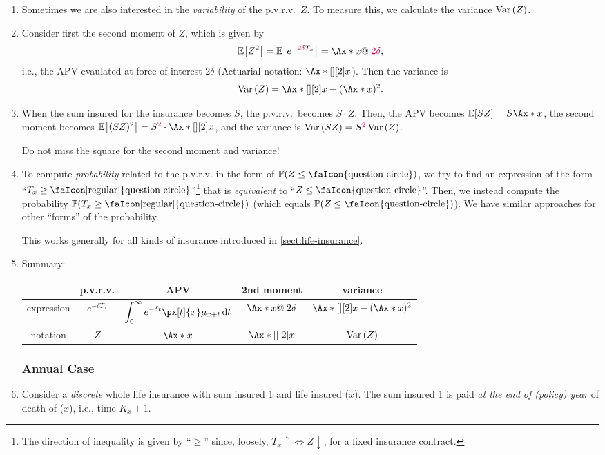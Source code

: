 \begin{enumerate}
\item Sometimes we are also interested in the \emph{variability} of the
p.v.r.v.\ \(Z\). To measure this, we calculate the variance \(\operatorname{Var}\qty(Z)\).
\item Consider first the second moment of \(Z\), which is given by
\[
\expv{Z^2}=\expv{e^{-{\color{purple} 2\delta} T_x}}=\Ax*{x}@\;{\color{purple} 2\delta},
\]
i.e., the APV evaulated at force of interest \(2\delta\) (Actuarial notation:
\(\Ax*[][2]{x}\)). Then the variance is
\[
\vari{Z}=\Ax*[][2]{x}-(\Ax*{x})^2.
\]
\item When the sum insured for the insurance becomes \( S\), the p.v.r.v.\
becomes \(S\cdot Z\). Then, the APV becomes \(\expv{SZ}=S\Ax*{x}\), the second
moment becomes \(\expv{(SZ)^2}=S^{\color{purple}2}\cdot\Ax*[][2]{x}\), and the
variance is \(\operatorname{Var}\qty(SZ)=S^{\color{purple}2}\operatorname{Var}\qty(Z)\).
\begin{warning}
Do not miss the square for the second moment and variance!
\end{warning}
\item To compute \emph{probability} related to the p.v.r.v. in the form
of \(\prob{Z\le \text{\faIcon{question-circle}}}\), we try to find an
expression of the form
``\(T_x\ge\text{\faIcon[regular]{question-circle}}\)''\footnote{The direction
of inequality is given by ``\(\ge\)'' since, loosely, \(T_x\uparrow\iff
Z\downarrow\), for a fixed insurance contract.}  that is \emph{equivalent} to
``\(Z\le \text{\faIcon{question-circle}}\)''. Then, we instead compute the
probability \(\prob{T_x\ge\text{\faIcon[regular]{question-circle}}}\) (which
equals \(\prob{Z\le \text{\faIcon{question-circle}}}\)). We have similar
approaches for other ``forms'' of the probability.
\begin{note}
This works generally for all kinds of insurance introduced in
\cref{sect:life-insurance}.
\end{note}
\item
\label{it:cts-whole-life-fmlas}
 Summary:

\begin{tabular}{ccccc}
\toprule
&p.v.r.v.&APV&2nd moment&variance\\
\midrule
expression&\(e^{-\delta T_x}\)&\(\displaystyle\int_{0}^{\infty}e^{-\delta t}\px[t]{x}\mu_{x+t}\dd{t}\)
&\(\Ax*{x}@\;2\delta\)&\(\Ax*[][2]{x}-(\Ax*{x})^2\)\\
notation&\(Z\)&\(\Ax*{x}\)&\(\Ax*[][2]{x}\)&\(\operatorname{Var}\qty(Z)\)\\
\bottomrule
\end{tabular}
\subsubsection*{Annual Case}
\item Consider a \emph{discrete} whole life insurance with sum insured
\faIcon{money-bill-wave} 1 and life insured (\(x\)). The sum insured 1 is
paid \emph{at the end of (policy) year} of death of (\(x\)), i.e., time
\(K_x+1\).


\end{enumerate}
